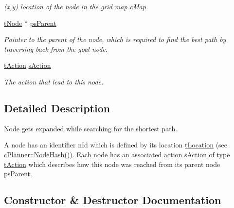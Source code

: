 \begin{DoxyCompactItemize}
\begin{DoxyCompactList}\small\item\em (x,y) location of the node in the grid map c\+Map. \end{DoxyCompactList}\item 
\mbox{\label{structplanner_1_1t_node_aa0d83ee95132d2d2af6a794189411fab}} 
\mbox{\hyperlink{structplanner_1_1t_node}{t\+Node}} $\ast$ \mbox{\hyperlink{structplanner_1_1t_node_aa0d83ee95132d2d2af6a794189411fab}{ps\+Parent}}
\begin{DoxyCompactList}\small\item\em Pointer to the parent of the node, which is required to find the best path by traversing back from the goal node. \end{DoxyCompactList}\item 
\mbox{\label{structplanner_1_1t_node_ad64b2f4aead654e8e187a9bbb0be483c}} 
\mbox{\hyperlink{structplanner_1_1t_action}{t\+Action}} \mbox{\hyperlink{structplanner_1_1t_node_ad64b2f4aead654e8e187a9bbb0be483c}{s\+Action}}
\begin{DoxyCompactList}\small\item\em The action that lead to this node. \end{DoxyCompactList}\end{DoxyCompactItemize}


\subsection{Detailed Description}
Node gets expanded while searching for the shortest path. 

A node has an identifier n\+Id which is defined by its location \mbox{\hyperlink{structplanner_1_1t_location}{t\+Location}} (see \mbox{\hyperlink{classplanner_1_1c_planner_a5ae4464a4d418cda71f4a8133d592c93}{c\+Planner\+::\+Node\+Hash()}}). Each node has an associated action s\+Action of type \mbox{\hyperlink{structplanner_1_1t_action}{t\+Action}} which describes how this node was reached from its parent node ps\+Parent. 

\subsection{Constructor \& Destructor Documentation}
\mbox{\label{structplanner_1_1t_node_a83ff217ef060b93698045b2357999594}} 
